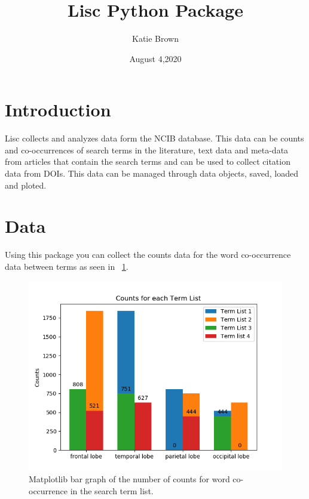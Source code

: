 \documentclass{article}
\title{Lisc Python Package}
\author{Katie Brown}
\date{August 4,2020}
\begin{document}
\maketitle

\section{Introduction}

Lisc collects and analyzes data form the NCIB database. This data can be counts and co-occurrences of search terms in the literature, text data and meta-data from articles that contain the search terms and can be used to collect citation data from DOIs. This data can be managed through data objects, saved, loaded and ploted.

\section{Data}
Using this package you can collect the counts data for the word co-occurrence data between terms as seen in ~\ref{fig:1}.

% 
\begin{figure} 
  \centering 
  \includegraphics[width=0.9/textwidth]{counts.png}
  \caption{Matplotlib bar graph of the number of counts for word co-occurrence in the search term list.} 
  \label{fig:1}
\end{figure}
%
\end{document}
